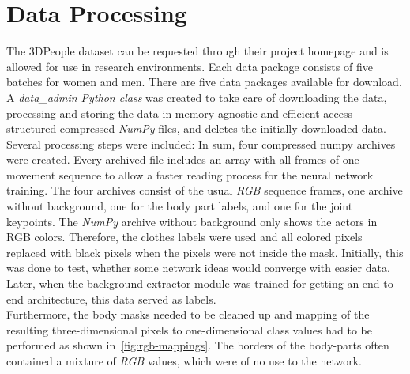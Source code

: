 \section{Data Processing}
The 3DPeople dataset can be requested through their project homepage and is allowed for use in research
environments.
Each data package consists of five batches for women and men. There are five data packages available for download.
A \textit{data\_admin Python class} was created to take care of downloading the data, processing and storing the
data
in memory agnostic and efficient access structured compressed \textit{NumPy} files, and deletes the initially downloaded data.\\
Several processing steps were included:
In sum, four compressed numpy archives were created.
Every archived file includes an array with all frames of one movement sequence to allow a faster reading process for
the neural network training.
The four archives consist of the usual \textit{RGB} sequence frames, one archive without background, one for the body part
labels,
and one for the joint keypoints.
The \textit{NumPy} archive without background only shows the actors in RGB colors.
Therefore, the clothes labels were used and all colored pixels replaced with black pixels when the pixels were not
inside the mask.
Initially, this was done to test, whether some network ideas would converge with easier data.
Later, when the background-extractor module was trained for getting an end-to-end architecture, this data served as
labels.\\
Furthermore, the body masks needed to be cleaned up and mapping of the resulting three-dimensional pixels to one-dimensional class
values had to be performed as shown in~\autoref{fig:rgb-mappings}.
The borders of the body-parts often contained a mixture of \textit{RGB} values, which were of no use to the network.\\
